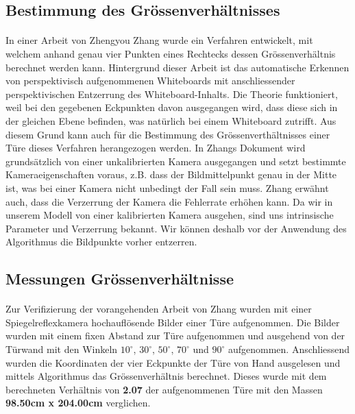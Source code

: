 \subsection{Bestimmung des Grössenverhältnisses}


\paragraph{}
In einer Arbeit von Zhengyou Zhang \cite{zhangrectification} wurde ein Verfahren entwickelt, mit welchem anhand genau vier Punkten eines Rechtecks dessen Grössenverhältnis berechnet werden kann. Hintergrund dieser Arbeit ist das automatische Erkennen von perspektivisch aufgenommenen Whiteboards mit anschliessender perspektivischen Entzerrung des Whiteboard-Inhalts.
\noindent
Die Theorie funktioniert, weil bei den gegebenen Eckpunkten davon ausgegangen wird, dass diese sich in der gleichen Ebene befinden, was natürlich bei einem Whiteboard zutrifft. Aus diesem Grund kann auch für die Bestimmung des Grössenverthältnisses einer Türe dieses Verfahren herangezogen werden.
\noindent
In Zhangs Dokument wird grundsätzlich von einer unkalibrierten Kamera ausgegangen und setzt bestimmte Kameraeigenschaften voraus, z.B. dass der Bildmittelpunkt genau in der Mitte ist, was bei einer Kamera nicht unbedingt der Fall sein muss. Zhang erwähnt auch, dass die Verzerrung der Kamera die Fehlerrate erhöhen kann. Da wir in unserem Modell von einer kalibrierten Kamera ausgehen, sind uns intrinsische Parameter und Verzerrung bekannt. Wir können deshalb vor der Anwendung des Algorithmus die Bildpunkte vorher entzerren.


\subsection{Messungen Grössenverhältnisse}

\paragraph{}
Zur Verifizierung der vorangehenden Arbeit von Zhang \cite{zhangrectification} wurden mit einer Spiegelreflexkamera hochauflösende Bilder einer Türe aufgenommen. Die Bilder wurden mit einem fixen Abstand zur Türe aufgenommen und ausgehend von der Türwand mit den Winkeln $10^\circ$, $30^\circ$, $50^\circ$, $70^\circ$ und $90^\circ$ aufgenommen. Anschliessend wurden die Koordinaten der vier Eckpunkte der Türe von Hand ausgelesen und mittels Algorithmus das Grössenverhältnis berechnet. Dieses wurde mit dem berechneten Verhältnis von \textbf{2.07} der aufgenommenen Türe mit den Massen \textbf{98.50cm x 204.00cm} verglichen.

